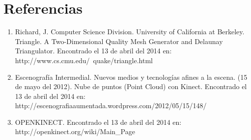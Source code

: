 \documentclass[letterpaper]{article}
\begin{document}
\section{Referencias}

\begin{enumerate}

\item Richard, J. Computer Science Division. University of California at Berkeley. Triangle. A Two-Dimensional Quality Mesh Generator and 
Delaunay Triangulator. Encontrado el 13 de abril del 2014 en: http://www.cs.cmu.edu/~quake/triangle.html
\item Escenografía Intermedial. Nuevos medios y tecnologías afines a la escena. (15 de mayo del 2012).
Nube de puntos (Point Cloud) con Kinect. Encontrado el 13 de abril del 2014 en: http://escenografiaaumentada.wordpress.com/2012/05/15/148/
\item OPENKINECT. Encontrado el 13 de abril del 2014 en: http://openkinect.org/wiki/Main\_Page

\end{enumerate}

	
\end{document}
